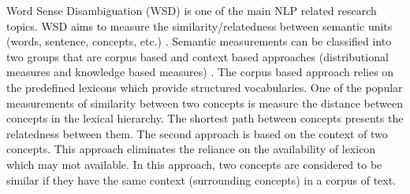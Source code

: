 \documentclass[Journal, InsideFigs, DoubleSpace]{ascelike} %
\begin{document}
Word Sense Disambiguation (WSD) is one of the main NLP related research topics. WSD aims to measure the similarity/relatedness between semantic units (words, sentence, concepts, etc.) \cite{harispe15}. Semantic measurements can be classified into two groups that are corpus based and context based approaches (distributional measures and knowledge based measures) \cite{Harispe13}. The corpus based approach relies on the predefined lexicons which provide structured vocabularies. One of the popular measurements of similarity between two concepts is measure the distance between concepts in the lexical hierarchy. The shortest path between concepts presents the relatedness between them. The second approach is based on the context of two concepts. This approach eliminates the reliance on the availability of lexicon which may mot available. In this approach, two concepts are considered to be similar if they have the same context (surrounding concepts) in a corpus of text.




\end{document}
